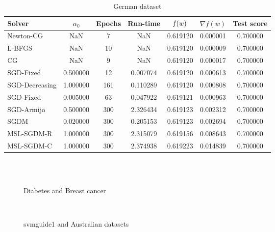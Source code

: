 \begin{table}
\caption{German dataset}
\label{tab:german-tab}
\centering
\begin{tabular}{lS[round-precision=3]S[drop-zero-decimal]S[round-precision=4]S[round-precision=6]S[exponent-mode=scientific]S[round-precision=6]}
\toprule
Solver & {$\alpha_0$} & {Epochs} & {Run-time} & {$\operatorname*{\mathit{f}}(w)$} & {$\nabla f(w)$} & {Test score} \\
\midrule
Newton-CG & NaN & 7 & NaN & 0.619120 & 0.000001 & 0.700000 \\
L-BFGS & NaN & 10 & NaN & 0.619120 & 0.000009 & 0.700000 \\
CG & NaN & 9 & NaN & 0.619120 & 0.000017 & 0.700000 \\
SGD-Fixed & 0.500000 & 12 & 0.007074 & 0.619120 & 0.000613 & 0.700000 \\
SGD-Decreasing & 1.000000 & 161 & 0.110289 & 0.619120 & 0.000808 & 0.700000 \\
SGD-Fixed & 0.005000 & 63 & 0.047922 & 0.619121 & 0.000963 & 0.700000 \\
SGD-Armijo & 0.500000 & 300 & 2.326434 & 0.619123 & 0.002312 & 0.700000 \\
SGDM & 0.020000 & 300 & 0.205153 & 0.619123 & 0.002694 & 0.700000 \\
MSL-SGDM-R & 1.000000 & 300 & 2.315079 & 0.619156 & 0.008643 & 0.700000 \\
MSL-SGDM-C & 1.000000 & 300 & 2.374938 & 0.619223 & 0.014839 & 0.700000 \\
\bottomrule
\end{tabular}
\end{table}


\begin{figure}
\centering
 \\
 \\
\caption[]{Diabetes and Breast cancer}
\label{fig:diab-breast}
\end{figure}

\begin{figure}
\centering
 \\
\caption[]{svmguide1 and Australian datasets}
\label{fig:svm-austr}
\end{figure}

